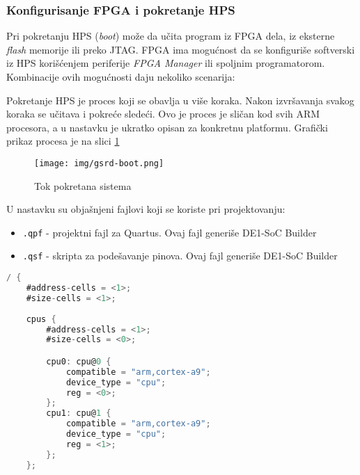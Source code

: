 \subsubsection{Konfigurisanje FPGA i pokretanje HPS}
Pri pokretanju HPS (\textit{boot}) može da učita program iz FPGA dela, iz eksterne \textit{flash} memorije ili preko JTAG. FPGA ima mogućnost da se konfiguriše softverski iz HPS korišćenjem periferije \textit{FPGA Manager} ili spoljnim programatorom. Kombinacije ovih mogućnosti daju nekoliko scenarija:

Pokretanje HPS je proces koji se obavlja u više koraka. Nakon izvršavanja svakog koraka se učitava i pokreće sledeći. Ovo je proces je sličan kod svih ARM procesora, a u nastavku je ukratko opisan za konkretnu platformu. Grafički prikaz procesa je na slici \ref{slika1:bootr}

\begin{figure}[h!]
\centering
\texttt{[image: img/gsrd-boot.png]}
\caption{Tok pokretana sistema}
\label{slika1:bootr}
\end{figure}

U nastavku su objašnjeni fajlovi koji se koriste pri projektovanju:
\begin{itemize}
\item \texttt{.qpf} - projektni fajl za Quartus. Ovaj fajl generiše DE1-SoC Builder
\item \texttt{.qsf} - skripta za podešavanje pinova. Ovaj fajl generiše DE1-SoC Builder
\end{itemize} 
\pagebreak
\begin{lstlisting}[language=C]
/ {
	#address-cells = <1>;
	#size-cells = <1>;
	
	cpus {
		#address-cells = <1>;
		#size-cells = <0>;

		cpu0: cpu@0 {
			compatible = "arm,cortex-a9";
			device_type = "cpu";
			reg = <0>;
		};
		cpu1: cpu@1 {
			compatible = "arm,cortex-a9";
			device_type = "cpu";
			reg = <1>;
		};
	};
\end{lstlisting}